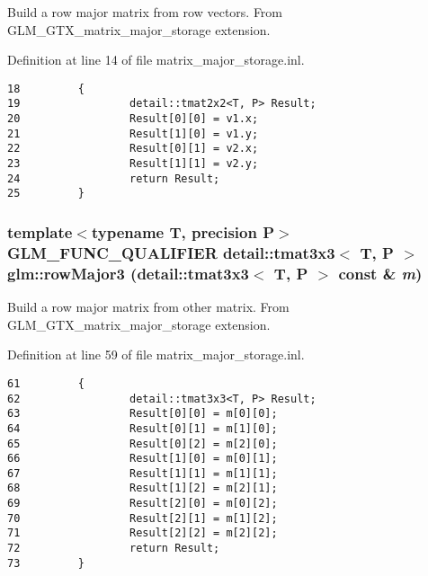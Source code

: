 Build a row major matrix from row vectors. From GLM\_\-GTX\_\-matrix\_\-major\_\-storage extension. 

Definition at line 14 of file matrix\_\-major\_\-storage.inl.

\begin{Code}\begin{verbatim}18         {
19                 detail::tmat2x2<T, P> Result;
20                 Result[0][0] = v1.x;
21                 Result[1][0] = v1.y;
22                 Result[0][1] = v2.x;
23                 Result[1][1] = v2.y;
24                 return Result;
25         }
\end{verbatim}
\end{Code}


\hypertarget{group__gtx__matrix__major__storage_g292c13103d16ead7193def8fcbcfa9fb}{
\subsubsection[rowMajor3]{\setlength{\rightskip}{0pt plus 5cm}template$<$typename T, precision P$>$ GLM\_\-FUNC\_\-QUALIFIER detail::tmat3x3$<$ T, P $>$ glm::rowMajor3 (detail::tmat3x3$<$ T, P $>$ const \& {\em m})}}
\label{group__gtx__matrix__major__storage_g292c13103d16ead7193def8fcbcfa9fb}


Build a row major matrix from other matrix. From GLM\_\-GTX\_\-matrix\_\-major\_\-storage extension. 

Definition at line 59 of file matrix\_\-major\_\-storage.inl.

\begin{Code}\begin{verbatim}61         {
62                 detail::tmat3x3<T, P> Result;
63                 Result[0][0] = m[0][0];
64                 Result[0][1] = m[1][0];
65                 Result[0][2] = m[2][0];
66                 Result[1][0] = m[0][1];
67                 Result[1][1] = m[1][1];
68                 Result[1][2] = m[2][1];
69                 Result[2][0] = m[0][2];
70                 Result[2][1] = m[1][2];
71                 Result[2][2] = m[2][2];
72                 return Result;
73         }
\end{verbatim}
\end{Code}


